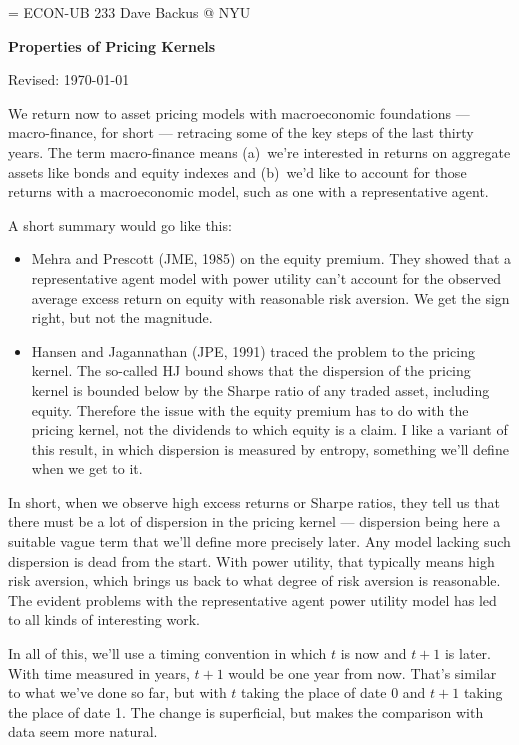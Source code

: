 \documentclass[11pt]{article}
\begin{document}
\parskip=\bigskipamount
\parindent=0.0in
\thispagestyle{empty}
{\large ECON-UB 233 \hfill Dave Backus @ NYU}

\bigskip\bigskip
\centerline{\Large \bf Properties of Pricing Kernels}
\centerline{Revised: \today}

\bigskip
We return now to asset pricing models with macroeconomic foundations ---
macro-finance, for short ---
retracing some of the key steps of the last thirty years.
The term macro-finance means
(a)~we're interested in returns on aggregate assets like bonds and equity indexes
and (b)~we'd like to account for those returns with a macroeconomic model,
such as one with a representative agent.

A short summary would go like this:
%
\begin{itemize}
\item Mehra and Prescott (JME, 1985) on the equity premium.
They showed that a representative agent model with power utility
can't account for the observed average excess return on equity
with reasonable risk aversion.
We get the sign right, but not the magnitude.
\item Hansen and Jagannathan (JPE, 1991) traced the problem to the pricing kernel.
The so-called HJ bound shows that the dispersion of the pricing kernel
is bounded below by the Sharpe ratio of any traded asset, including equity.
Therefore the issue with the equity premium has to do with the pricing kernel,
not the dividends to which equity is a claim.
I like a variant of this result, in which dispersion is measured
by entropy, something we'll define when we get to it.
\end{itemize}
%
In short, when we observe high excess returns or Sharpe ratios,
they tell us that there must be a lot of dispersion in the pricing kernel ---
dispersion being here a suitable vague term that we'll define more precisely later.
Any model lacking such dispersion is dead from the start.
With power utility, that typically means high risk aversion,
which brings us back to what degree of risk aversion is reasonable.
The evident problems with the representative agent power utility model
has led to all kinds of interesting work.

In all of this, we'll use a timing convention in which $t$ is now
and $t+1$ is later.
With time measured in years, $t+1$ would be one year from now.
That's similar to what we've done so far,
but with $t$ taking the place of date 0 and $t+1$ taking the place of date 1.
The change is superficial, but makes the comparison with data
seem more natural.
\end{document}
